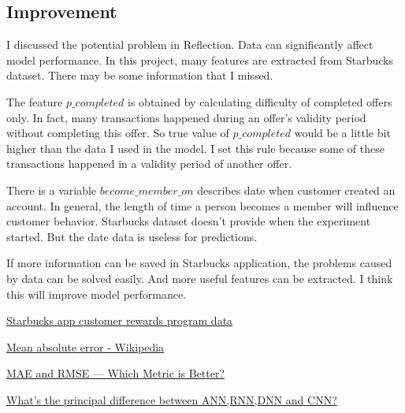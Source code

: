 \documentclass[a4paper,12pt]{article}
\begin{document}
\subsection*{Improvement}

I discussed the potential problem in Reflection. Data can significantly affect model performance. In this project, many features 
are extracted from Starbucks dataset. There may be some information that I missed.

The feature $p\_completed$ is obtained by calculating difficulty of completed offers only. In fact, many transactions happened 
during an offer's validity period without completing this offer. So true value of $p\_completed$ would be a little bit higher 
than the data I used in the model. I set this rule because some of these transactions happened in a validity period of another 
offer.

There is a variable $become\_member\_on$ describes date when customer created an account. In general, the length of time a 
person becomes a member will influence customer behavior. Starbucks dataset doesn't provide when the experiment started. But 
the date data is useless for predictions.

If more information can be saved in Starbucks application, the problems caused by data can be solved easily. And more useful 
features can be extracted. I think this will improve model performance.

\begin{thebibliography}{9}

    \href{https://www.kaggle.com/datasets/blacktile/starbucks-app-customer-reward-program-data}
    {Starbucks app customer rewards program data}

    \href{https://en.wikipedia.org/wiki/Mean_absolute_error}{Mean absolute error - Wikipedia}

    \href{https://medium.com/human-in-a-machine-world/mae-and-rmse-which-metric-is-better-e60ac3bde13d}
    {MAE and RMSE — Which Metric is Better?}

    \href{https://datascience.stackexchange.com/questions/58728/whats-the-principal-difference-between-ann-rnn-dnn-and-cnn}
    {What's the principal difference between ANN,RNN,DNN and CNN?}

\end{thebibliography}
\end{document}
